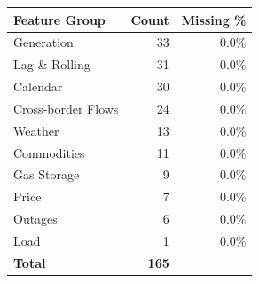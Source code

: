 \begin{tabular}{l r r}
\toprule
\textbf{Feature Group} & \textbf{Count} & \textbf{Missing \%} \\
\midrule
Generation & 33 & 0.0\% \\
Lag \& Rolling & 31 & 0.0\% \\
Calendar & 30 & 0.0\% \\
Cross-border Flows & 24 & 0.0\% \\
Weather & 13 & 0.0\% \\
Commodities & 11 & 0.0\% \\
Gas Storage & 9 & 0.0\% \\
Price & 7 & 0.0\% \\
Outages & 6 & 0.0\% \\
Load & 1 & 0.0\% \\
\midrule
\textbf{Total} & \textbf{165} & \\
\bottomrule
\end{tabular}